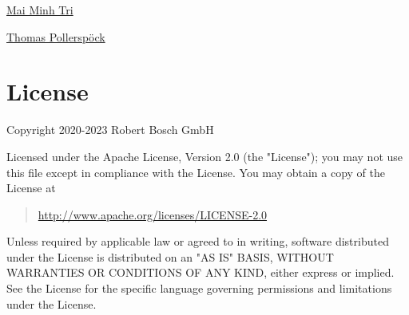 \href{mailto:Tri.MaiMinh@vn.bosch.com}{Mai Minh Tri}

\href{mailto:Thomas.Pollerspoeck@de.bosch.com}{Thomas Pollerspöck}

\hypertarget{description-license}{%
\section{License}\label{description-license}}

Copyright 2020-2023 Robert Bosch GmbH

Licensed under the Apache License, Version 2.0 (the "License"); you may
not use this file except in compliance with the License. You may obtain
a copy of the License at

\begin{quote}
\url{http://www.apache.org/licenses/LICENSE-2.0}
\end{quote}

Unless required by applicable law or agreed to in writing, software
distributed under the License is distributed on an "AS IS" BASIS,
WITHOUT WARRANTIES OR CONDITIONS OF ANY KIND, either express or implied.
See the License for the specific language governing permissions and
limitations under the License.
